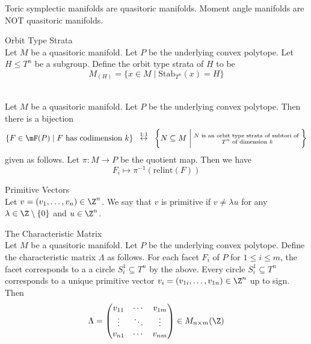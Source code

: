 \documentclass[a4paper]{article}
\begin{document}
Toric symplectic manifolds are quasitoric manifolds. Moment angle manifolds are NOT quasitoric manifolds. 

\begin{defn}{Orbit Type Strata}{}\\
Let $M$ be a quasitoric manifold. Let $P$ be the underlying convex polytope. Let $H\leq T^n$ be a subgroup. Define the orbit type strata of $H$ to be $$M_{(H)}=\{x\in M\;|\;\text{Stab}_{T^n}(x)=H\}$$
\end{defn}

\begin{prp}{}{}\\
Let $M$ be a quasitoric manifold. Let $P$ be the underlying convex polytope. Then there is a bijection $$\{F\in\mF(P)\;|\;F\text{ has codimension }k\}\;\;\overset{1:1}{\leftrightarrow}\;\;\left\{N\subseteq M\;\bigg{|}\;\substack{N\text{ is an orbit type strata of subtori of }\\T^n\text{ of dimension }k}\right\}$$ given as follows. Let $\pi:M\to P$ be the quotient map. Then we have $$F_i\mapsto\pi^{-1}(\text{relint}(F))$$
\end{prp}

\begin{defn}{Primitive Vectors}{}\\
Let $v=(v_1,\dots,v_n)\in\Z^n$. We say that $v$ is primitive if $v\neq\lambda u$ for any $\lambda\in\Z\setminus\{0\}$ and $u\in\Z^n$. 
\end{defn}

\begin{defn}{The Characteristic Matrix}{}\\
Let $M$ be a quasitoric manifold. Let $P$ be the underlying convex polytope. Define the characteristic matrix $\Lambda$ as follows. For each facet $F_i$ of $P$ for $1\leq i\leq m$, the facet corresponds to a a circle $S_i^1\subseteq T^n$ by the above. Every circle $S_i^1\subseteq T^n$ corresponds to a unique primitive vector $v_i=(v_{1i},\dots,v_{1n})\in\Z^n$ up to sign. Then $$\Lambda=\begin{pmatrix}
v_{11} & \cdots & v_{1m}\\
\vdots & \ddots & \vdots\\
v_{n1} & \cdots & v_{nm}
\end{pmatrix}\in M_{n\times m}(\Z)$$
\end{defn}
\end{document}
